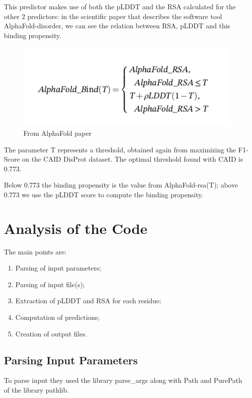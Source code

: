 This predictor makes use of both the pLDDT and the RSA calculated for the other 2 predictors: in the scientific paper \cite{alphafold-disorder} that describes the software tool AlphaFold-disorder, we can see the relation between RSA, pLDDT and this binding propensity.
\begin{figure}
    \centering
    \includegraphics[scale=.7]{res/alphafold-binding.png}
    \caption{From AlphaFold paper \cite{alphafold-disorder}}
    \label{fig:enter-label}
\end{figure}


The parameter T represents a threshold, obtained again from maximizing the F1-Score on the CAID DisProt dataset. The optimal threshold found with CAID is 0.773. 

Below 0.773 the binding propensity is the value from AlphaFold-rsa(T); above 0.773 we use the pLDDT score to compute the binding propensity.

\pagebreak

\section{Analysis of the Code}
The main points are: 
\begin{enumerate}

    \item Parsing of input parameters;
    \item Parsing of input file(s);
    \item Extraction of pLDDT and RSA for each residue;
    \item Computation of predictions;
    \item Creation of output files.
\end{enumerate}

\subsection{Parsing Input Parameters}
To parse input they used the library parse\_args along with Path and PurePath of the library pathlib.

